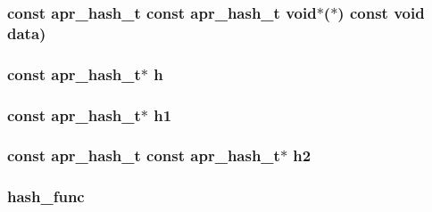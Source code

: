 \subsubsection[{\texorpdfstring{data}{data}}]{\setlength{\rightskip}{0pt plus 5cm}const {\bf apr\+\_\+hash\+\_\+t} const {\bf apr\+\_\+hash\+\_\+t} {\bf void}$\ast$($\ast$) const {\bf void} {\bf data}) }\hypertarget{group__apr__hash_gac29b1ff61f790101fde32d55f857b7cc}{}\label{group__apr__hash_gac29b1ff61f790101fde32d55f857b7cc}
\subsubsection[{\texorpdfstring{h}{h}}]{\setlength{\rightskip}{0pt plus 5cm}const {\bf apr\+\_\+hash\+\_\+t}$\ast$ h}\hypertarget{group__apr__hash_ga0d6dcb41ca5e794b318df5f6fd273ee2}{}\label{group__apr__hash_ga0d6dcb41ca5e794b318df5f6fd273ee2}
\subsubsection[{\texorpdfstring{h1}{h1}}]{\setlength{\rightskip}{0pt plus 5cm}const {\bf apr\+\_\+hash\+\_\+t}$\ast$ h1}\hypertarget{group__apr__hash_ga7424aa17231f37fcf2350b861ca9b549}{}\label{group__apr__hash_ga7424aa17231f37fcf2350b861ca9b549}
\subsubsection[{\texorpdfstring{h2}{h2}}]{\setlength{\rightskip}{0pt plus 5cm}const {\bf apr\+\_\+hash\+\_\+t} const {\bf apr\+\_\+hash\+\_\+t}$\ast$ h2}\hypertarget{group__apr__hash_gaebeb34ebcc8806faa82df3123f4423cf}{}\label{group__apr__hash_gaebeb34ebcc8806faa82df3123f4423cf}
\subsubsection[{\texorpdfstring{hash\+\_\+func}{hash_func}}]{ hash\+\_\+func}\hypertarget{group__apr__hash_ga8ced7fc7b842146c08d741dfd8443457}{}\label{group__apr__hash_ga8ced7fc7b842146c08d741dfd8443457}
